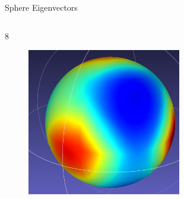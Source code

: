 \documentclass{beamer}
\begin{document}
\begin{frame}{Sphere Eigenvectors}
{\begin{columns}
\begin{column}[T]{5cm}
\begin{figure}[t]
\end{figure}
8
\begin{figure}[t]
    \includegraphics[width=0.6\textwidth]{Harmonics/SphereModes/sphere9.png}
\end{figure}
\end{column}
\end{columns}
}

\end{frame}
\end{document}
